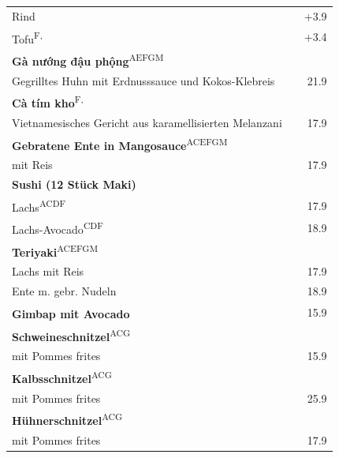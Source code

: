 \documentclass[a4paper,12pt]{article}
\newcommand{\vegan}{\textbf{\scriptsize \color{vegan}{Vegan}}}
\begin{document}
\begin{multicols}{2}
\begin{tabular}{Lrr}
\hspace{0.4cm}Rind & & +3.9\\
\hspace{0.4cm}Tofu\textsuperscript{{\scriptsize F, \vegan}} & & +3.4\\
\textbf{Gà nướng đậu phộng}\textsuperscript{{\scriptsize AEFGM}}\\
\hspace{0.4cm}\scriptsize Gegrilltes Huhn mit Erdnusssauce und Kokos-Klebreis & & 21.9\\
\textbf{Cà tím kho}\textsuperscript{{\scriptsize F, \vegan}}\\
\hspace{0.4cm}\scriptsize Vietnamesisches Gericht aus karamellisierten Melanzani & & 17.9\\
\textbf{Gebratene Ente in Mangosauce}\textsuperscript{{\scriptsize ACEFGM}}\\
\hspace{0.4cm}\scriptsize mit Reis & & 17.9\\
\textbf{Sushi (12 Stück Maki)}\\
\hspace{0.4cm}Lachs\textsuperscript{{\scriptsize ACDF}} & & 17.9\\
\hspace{0.4cm}Lachs-Avocado\textsuperscript{{\scriptsize CDF}} & & 18.9\\
\textbf{Teriyaki}\textsuperscript{{\scriptsize ACEFGM}}\\
\hspace{0.4cm}Lachs mit Reis & & 17.9\\
\hspace{0.4cm}Ente m. gebr. Nudeln & & 18.9\\
\textbf{Gimbap mit Avocado}\textsuperscript{{\scriptsize \vegan}} & & 15.9\\
\textbf{Schweineschnitzel}\textsuperscript{{\scriptsize ACG}}\\
\hspace{0.4cm}\scriptsize  mit Pommes frites & & 15.9\\
\textbf{Kalbsschnitzel}\textsuperscript{{\scriptsize ACG}}\\
\hspace{0.4cm}\scriptsize  mit Pommes frites & & 25.9\\
\textbf{Hühnerschnitzel}\textsuperscript{{\scriptsize ACG}}\\
\hspace{0.4cm}\scriptsize  mit Pommes frites & & 17.9
\end{tabular}

\end{multicols}
\end{document}
